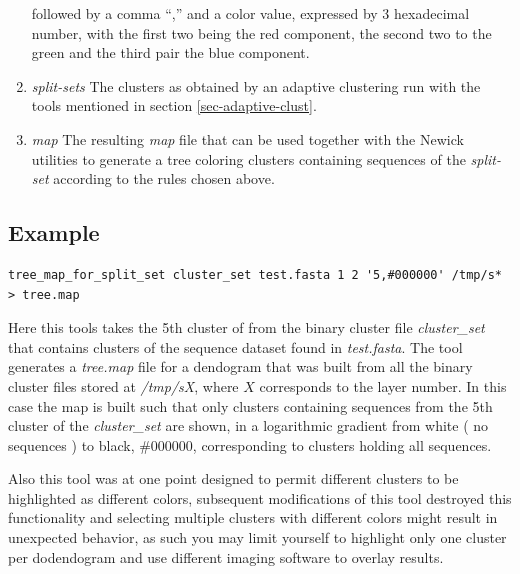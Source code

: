 \begin{enumerate}
    followed by a comma ``,'' and a color value, expressed by 3
    hexadecimal number, with the first two being the red component, the
    second two to the green and the third pair the blue component.
  \item \emph{split-sets} The clusters as obtained by an adaptive
    clustering run with the tools mentioned in section
    \ref{sec-adaptive-clust}.
  \item \emph{map} The resulting \emph{map} file that can be used
    together with the Newick utilities to generate a tree coloring
    clusters containing sequences of the \emph{split-set} according to
    the rules chosen above.
\end{enumerate}

\subsection{Example}
\begin{lstlisting}
tree_map_for_split_set cluster_set test.fasta 1 2 '5,#000000' /tmp/s* > tree.map
\end{lstlisting}
Here this tools takes the 5th cluster of from the binary cluster file
\emph{cluster\_set} that contains clusters of the sequence dataset
found in \emph{test.fasta}. The tool generates a \emph{tree.map} file
for a dendogram that was built from all the binary cluster files
stored at \emph{/tmp/sX}, where $X$ corresponds to the layer
number. In this case the map is built such that only clusters
containing sequences from the 5th cluster of the \emph{cluster\_set}
are shown, in a logarithmic gradient from white ( no sequences ) to
black, \#000000, corresponding to clusters holding all sequences.

Also this tool was at one point designed to permit different clusters
to be highlighted as different colors, subsequent modifications of this
tool destroyed this functionality and selecting multiple clusters with
different colors might result in unexpected behavior, as such you may
limit yourself to highlight only one cluster per dodendogram and use
different imaging software to overlay results.


